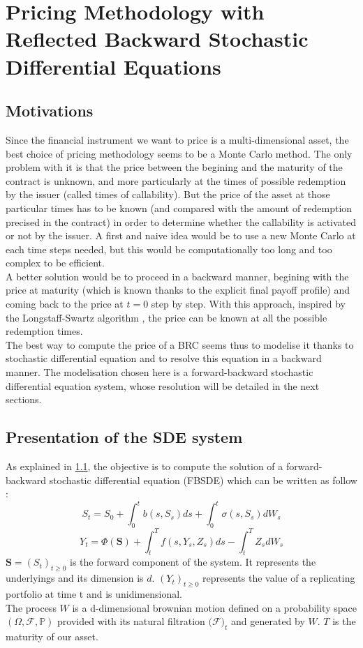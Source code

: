 \documentclass[a4paper,11pt,english]{book}
\begin{document}
\pagestyle{fancy}

\chapter{Pricing Methodology with Reflected Backward Stochastic Differential Equations}
\label{chap:pricing-methodology}
\section{Motivations}
\label{sec:motivations}
Since the financial instrument we want to price is a multi-dimensional asset, the best choice of pricing methodology seems to be a Monte Carlo method. The only problem with it is that the price between the begining and the maturity of the contract is unknown, and more particularly at the times of possible redemption by the issuer (called times of callability). But the price of the asset at those particular times has to be known (and compared with the amount of redemption precised in the contract) in order to determine whether the callability is activated or not by the issuer. A first and naive idea would be to use a new Monte Carlo at each time steps needed, but this would be computationally too long and too complex to be efficient.  \\

A better solution would be to proceed in a backward manner, begining with the price at maturity (which is known thanks to the explicit final payoff profile) and coming back to the price at $t=0$ step by step. With this approach, inspired by the Longstaff-Swartz algorithm \cite{schwartz2001valuing}, the price can be known at all the possible redemption times.\\

The best way to compute the price of a BRC seems thus to modelise it thanks to stochastic differential equation and to resolve this equation in a backward manner. The modelisation chosen here is a forward-backward stochastic differential equation system, whose resolution will be detailed in the next sections.

\section{Presentation of the SDE system}
\label{sec:SDE-presentation}
As explained in \ref{sec:motivations}, the objective is to compute the solution of  a forward-backward stochastic differential equation (FBSDE) which can be written as follow :
$$S_{t} = S_{0}+\int_{0}^{t}b(s,S_{s})ds +\int_{0}^{t} \sigma(s,S_{s})dW_{s}$$
$$Y_{t} = \Phi(\textbf{S}) + \int_{t}^{T}f(s,Y_{s},Z_{s})ds -\int_{t}^{T}Z_{s}dW_{s}$$
$\textbf{S}=(S_{t})_{t\geq0}$ is the forward component of the system. It represents the underlyings and its dimension is $d$. $(Y_{t})_{t\geq0}$ represents the value of a replicating portfolio at time t and is unidimensional.\\
The process $W$ is a d-dimensional brownian motion defined on a probability space $(\Omega,\mathcal{F},\mathbb{P})$ provided with its natural filtration $(\mathcal{F)}_{t}$ and generated by $W$. 
$T$ is the maturity of our asset.\\
\end{document}
